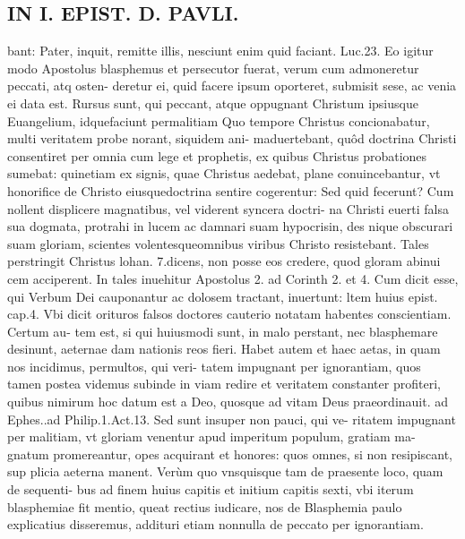 \documentclass{article}
\begin{document}
\begin{pages}
\section*{IN I. EPIST. D. PAVLI. }
\marginpar{[ p.35 ]}\pstart   bant: Pater, inquit, remitte illis, nesciunt enim quid faciant. Luc.23. Eo igitur modo Apostolus blasphemus et persecutor fuerat, verum cum admoneretur peccati, atq osten- deretur ei, quid facere ipsum oporteret, submisit sese, ac venia ei data est. Rursus sunt, qui peccant, atque  oppugnant Christum ipsiusque  Euangelium, idquefaciunt permalitiam Quo tempore Christus concionabatur, multi veritatem probe norant, siquidem ani- maduertebant, quôd doctrina Christi consentiret per omnia cum lege et prophetis, ex quibus Christus probationes sumebat: quinetiam ex signis, quae Christus aedebat, plane conuincebantur, vt honorifice de Christo eiusquedoctrina sentire cogerentur: Sed quid fecerunt? Cum nollent displicere magnatibus, vel viderent syncera doctri- na Christi euerti falsa sua dogmata, protrahi in lucem ac damnari suam hypocrisin, des nique  obscurari suam gloriam, scientes volentesqueomnibus viribus Christo resistebant. Tales perstringit Christus lohan. 7.dicens, non posse eos credere, quod gloram abinui cem acciperent. In tales inuehitur Apostolus 2. ad Corinth 2. et 4. Cum dicit esse, qui Verbum Dei cauponantur ac dolosem tractant, inuertunt: ltem huius epist. cap.4. Vbi dicit orituros falsos doctores cauterio notatam habentes conscientiam. Certum au- tem est, si qui huiusmodi sunt, in malo perstant, nec blasphemare desinunt, aeternae dam nationis reos fieri. Habet autem et haec aetas, in quam nos incidimus, permultos, qui veri- tatem impugnant per ignorantiam, quos tamen postea videmus subinde in viam redire et veritatem constanter profiteri, quibus nimirum hoc datum est a Deo, quosque  ad vitam Deus praeordinauit. ad Ephes..ad Philip.1.Act.13. Sed sunt insuper non pauci, qui ve- ritatem impugnant per malitiam, vt gloriam venentur apud imperitum populum, gratiam ma- gnatum promereantur, opes acquirant et honores: quos omnes, si non resipiscant, sup plicia aeterna manent. Verùm quo vnsquisque  tam de praesente loco, quam de sequenti- bus ad finem huius capitis et initium capitis sexti, vbi iterum blasphemiae fit mentio, queat rectius iudicare, nos de Blasphemia paulo explicatius disseremus, addituri etiam nonnulla de peccato per ignorantiam.  \pend
{}
{}

\end{pages}
\end{document}
